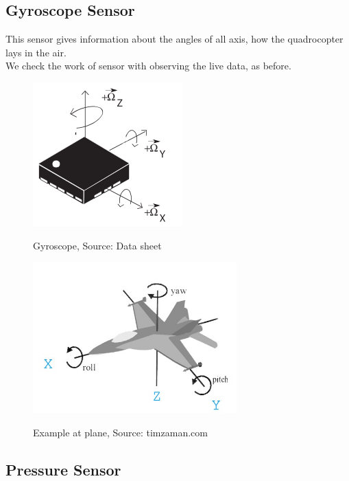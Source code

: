 \subsection{Gyroscope Sensor}

This sensor gives information about the angles of all axis, how the quadrocopter lays in the air.\\
We check the work of sensor with observing the live data, as before.

\begin{figure}[H]
	\centering
		\includegraphics{fig/ch-sensor_testing_concept/gyroscope.png}%
	\label{fig:IMU_Gyro}
	\caption{Gyroscope, Source: Data sheet}
\end{figure}


\begin{figure}[H]
	\centering
		\includegraphics[width=0.7\textwidth]{fig/ch-sensor_testing_concept/timzaman.jpg}%
	\label{fig:IMU_Gyro}
	\caption{Example at plane, Source: timzaman.com}
\end{figure}



\subsection{Pressure Sensor}

